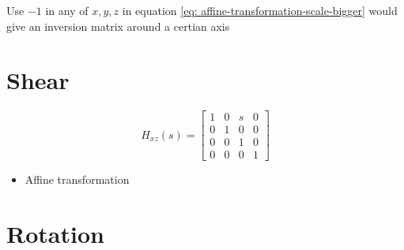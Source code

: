   Use $ -1 $ in any of $ x, y, z $ in equation
  \ref{eq: affine-transformation-scale-bigger} would give an inversion matrix
  around a certian axis

\section{Shear}

  \begin{equation}
    H_{xz}\left( s \right) =
    \begin{bmatrix}
      1 & 0 & s & 0 \\
      0 & 1 & 0 & 0 \\
      0 & 0 & 1 & 0 \\
      0 & 0 & 0 & 1
    \end{bmatrix}
  \end{equation}

  \begin{itemize}
    \item Affine transformation
  \end{itemize}

\section{Rotation}

